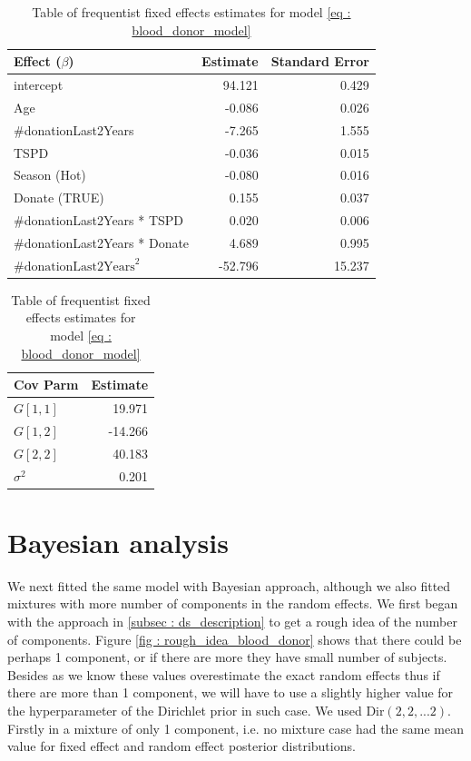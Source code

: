 \begin{table}[!htb]
\centering
\caption{Table of frequentist fixed effects estimates for model \ref{eq : blood_donor_model}}
\label{table : frequentist_fixed effects}
\begin{tabular}{@{}lrr@{}}
\toprule
Effect ($\beta$) & Estimate & Standard Error \\ \midrule
intercept & 94.121 & 0.429 \\
Age & -0.086 & 0.026 \\
\#donationLast2Years & -7.265 & 1.555 \\
TSPD & -0.036 & 0.015 \\
Season (Hot) & -0.080 & 0.016 \\
Donate (TRUE) & 0.155 & 0.037 \\
\#donationLast2Years * TSPD & 0.020 & 0.006 \\
\#donationLast2Years * Donate & 4.689 & 0.995 \\
$\text{\#donationLast2Years}^2$ & -52.796 & 15.237 \\ \bottomrule
\end{tabular}

\begin{tabular}{@{}lr@{}}
\toprule
Cov Parm & Estimate \\ \midrule
$G[1,1]$ & 19.971 \\
$G[1,2]$ & -14.266 \\
$G[2,2]$ & 40.183 \\
$\sigma^2$ & 0.201 \\ \bottomrule
\end{tabular}
\end{table}

\section{Bayesian analysis}
We next fitted the same model with Bayesian approach, although we also fitted mixtures with more number of components in the random effects. We first began with the approach in \ref{subsec : ds_description} to get a rough idea of the number of components. Figure \ref{fig : rough_idea_blood_donor} shows that there could be perhaps 1 component, or if there are more they have small number of subjects. Besides as we know these values overestimate the exact random effects thus if there are more than 1 component, we will have to use a slightly higher value for the hyperparameter of the Dirichlet prior in such case. We used $\text{Dir}(2, 2,...2)$. Firstly in a mixture of only 1 component, i.e. no mixture case had the same mean value for fixed effect and random effect posterior distributions.\\

